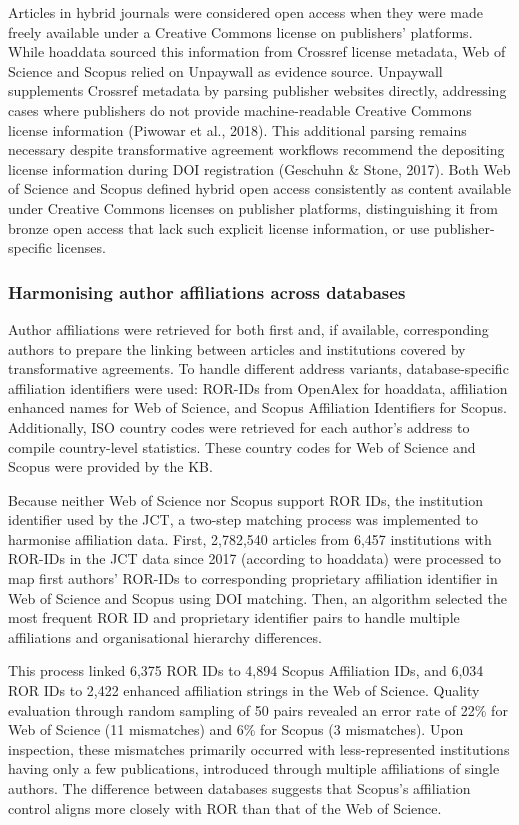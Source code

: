 \documentclass[a4paper,man,floatsintext,longtable,noextraspace,10pt]{apa6}
\begin{document}
Articles in hybrid journals were considered open access when they were
made freely available under a Creative Commons license on publishers'
platforms. While hoaddata sourced this information from Crossref license
metadata, Web of Science and Scopus relied on Unpaywall as evidence
source. Unpaywall supplements Crossref metadata by parsing publisher
websites directly, addressing cases where publishers do not provide
machine-readable Creative Commons license information (Piwowar et al.,
2018). This additional parsing remains necessary despite transformative
agreement workflows recommend the depositing license information during
DOI registration (Geschuhn \& Stone, 2017). Both Web of Science and
Scopus defined hybrid open access consistently as content available
under Creative Commons licenses on publisher platforms, distinguishing
it from bronze open access that lack such explicit license information,
or use publisher-specific licenses.

\subsubsection{Harmonising author affiliations across
databases}\label{harmonising-author-affiliations-across-databases}

Author affiliations were retrieved for both first and, if available,
corresponding authors to prepare the linking between articles and
institutions covered by transformative agreements. To handle different
address variants, database-specific affiliation identifiers were used:
ROR-IDs from OpenAlex for hoaddata, affiliation enhanced names for Web
of Science, and Scopus Affiliation Identifiers for Scopus. Additionally,
ISO country codes were retrieved for each author's address to compile
country-level statistics. These country codes for Web of Science and
Scopus were provided by the KB.

Because neither Web of Science nor Scopus support ROR IDs, the
institution identifier used by the JCT, a two-step matching process was
implemented to harmonise affiliation data. First, 2,782,540 articles
from 6,457 institutions with ROR-IDs in the JCT data since 2017
(according to hoaddata) were processed to map first authors' ROR-IDs to
corresponding proprietary affiliation identifier in Web of Science and
Scopus using DOI matching. Then, an algorithm selected the most frequent
ROR ID and proprietary identifier pairs to handle multiple affiliations
and organisational hierarchy differences.

This process linked 6,375 ROR IDs to 4,894 Scopus Affiliation IDs, and
6,034 ROR IDs to 2,422 enhanced affiliation strings in the Web of
Science. Quality evaluation through random sampling of 50 pairs revealed
an error rate of 22\% for Web of Science (11 mismatches) and 6\% for
Scopus (3 mismatches). Upon inspection, these mismatches primarily
occurred with less-represented institutions having only a few
publications, introduced through multiple affiliations of single
authors. The difference between databases suggests that Scopus's
affiliation control aligns more closely with ROR than that of the Web of
Science.
\end{document}
